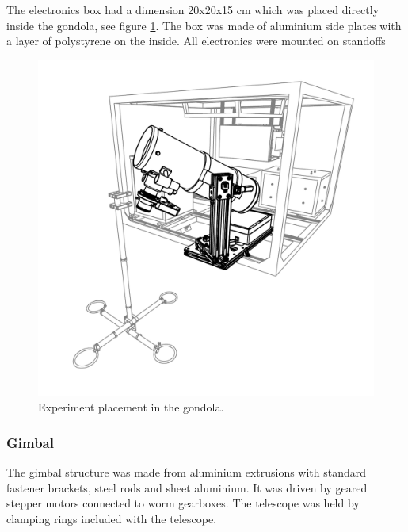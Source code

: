 The electronics box had a dimension 20x20x15 cm which was placed directly inside the gondola, see figure \ref{fig::mechanical::ebox}. The box was made of aluminium side plates with a layer of polystyrene on the inside. All electronics were mounted on standoffs 

\begin{figure}[H]
	\centering 
	\includegraphics[width=\textwidth]{4-experiment-design/img/mechanical/IRISC1.pdf}
	\caption{Experiment placement in the gondola.}
	\label{fig::mechanical::ebox}
\end{figure}


\subsubsection{Gimbal}
\label {sec:4.4.3}

The gimbal structure was made from aluminium extrusions with standard fastener brackets, steel rods and sheet aluminium. It was driven by geared stepper motors connected to worm gearboxes. The telescope was held by clamping rings included with the telescope. 

